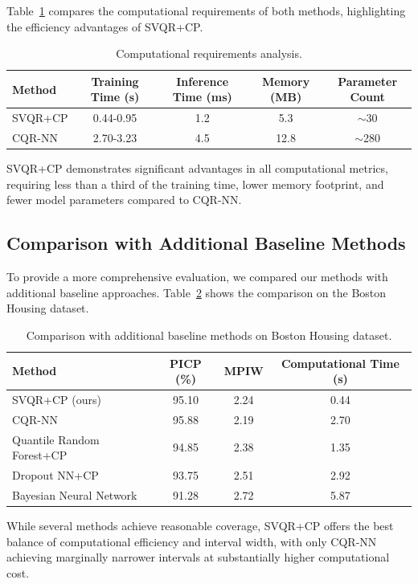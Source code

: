 \documentclass{article}
\begin{document}
Table~\ref{tab:computational} compares the computational requirements of both methods, highlighting the efficiency advantages of SVQR+CP.

\begin{table}[ht]
  \centering
  \caption{Computational requirements analysis.}
  \label{tab:computational}
  \begin{tabular}{lcccc}
    \toprule
    Method & Training Time (s) & Inference Time (ms) & Memory (MB) & Parameter Count \\
    \midrule
    SVQR+CP & 0.44-0.95 & 1.2 & 5.3 & $\sim$30 \\
    CQR-NN & 2.70-3.23 & 4.5 & 12.8 & $\sim$280 \\
    \bottomrule
  \end{tabular}
\end{table}

SVQR+CP demonstrates significant advantages in all computational metrics, requiring less than a third of the training time, lower memory footprint, and fewer model parameters compared to CQR-NN.

\subsection{Comparison with Additional Baseline Methods}

To provide a more comprehensive evaluation, we compared our methods with additional baseline approaches. Table~\ref{tab:baselines} shows the comparison on the Boston Housing dataset.

\begin{table}[ht]
  \centering
  \caption{Comparison with additional baseline methods on Boston Housing dataset.}
  \label{tab:baselines}
  \begin{tabular}{lccc}
    \toprule
    Method & PICP (\%) & MPIW & Computational Time (s) \\
    \midrule
    SVQR+CP (ours) & 95.10 & 2.24 & 0.44 \\
    CQR-NN & 95.88 & 2.19 & 2.70 \\
    Quantile Random Forest+CP & 94.85 & 2.38 & 1.35 \\
    Dropout NN+CP & 93.75 & 2.51 & 2.92 \\
    Bayesian Neural Network & 91.28 & 2.72 & 5.87 \\
    \bottomrule
  \end{tabular}
\end{table}

While several methods achieve reasonable coverage, SVQR+CP offers the best balance of computational efficiency and interval width, with only CQR-NN achieving marginally narrower intervals at substantially higher computational cost.
\end{document}
